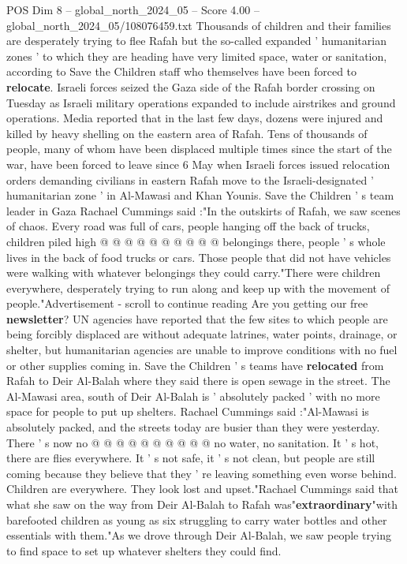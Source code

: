 \begin{textsample}{POS Dim 8 – global\_north\_2024\_05 – Score 4.00 – global\_north\_2024\_05/108076459.txt}  \label{ex:f8_pos_175}
Thousands of children and their families are desperately trying to flee Rafah but the so-called expanded ' humanitarian zones ' to which they are heading have very limited space, water or sanitation, according to Save the Children staff who themselves have been forced to \textbf{relocate}.
Israeli forces seized the Gaza side of the Rafah border crossing on Tuesday as Israeli military operations expanded to include airstrikes and ground operations.
Media reported that in the last few days, dozens were injured and killed by heavy shelling on the eastern area of Rafah.
Tens of thousands of people, many of whom have been displaced multiple times since the start of the war, have been forced to leave since 6 May when Israeli forces issued relocation orders demanding civilians in eastern Rafah move to the Israeli-designated ' humanitarian zone ' in Al-Mawasi and Khan Younis.
Save the Children ' s team leader in Gaza Rachael Cummings said :"In the outskirts of Rafah, we saw scenes of chaos.
Every road was full of cars, people hanging off the back of trucks, children piled high @ @ @ @ @ @ @ @ @ @ belongings there, people ' s whole lives in the back of food trucks or cars.
Those people that did not have vehicles were walking with whatever belongings they could carry."There were children everywhere, desperately trying to run along and keep up with the movement of people."Advertisement - scroll to continue reading Are you getting our free \textbf{newsletter}?
UN agencies have reported that the few sites to which people are being forcibly displaced are without adequate latrines, water points, drainage, or shelter, but humanitarian agencies are unable to improve conditions with no fuel or other supplies coming in.
Save the Children ' s teams have \textbf{relocated} from Rafah to Deir Al-Balah where they said there is open sewage in the street.
The Al-Mawasi area, south of Deir Al-Balah is ' absolutely packed ' with no more space for people to put up shelters.
Rachael Cummings said :"Al-Mawasi is absolutely packed, and the streets today are busier than they were yesterday.
There ' s now no @ @ @ @ @ @ @ @ @ @ no water, no sanitation.
It ' s hot, there are flies everywhere.
It ' s not safe, it ' s not clean, but people are still coming because they believe that they ' re leaving something even worse behind.
Children are everywhere.
They look lost and upset."Rachael Cummings said that what she saw on the way from Deir Al-Balah to Rafah was"\textbf{extraordinary}"with barefooted children as young as six struggling to carry water bottles and other essentials with them."As we drove through Deir Al-Balah, we saw people trying to find space to set up whatever shelters they could find.

\end{textsample}
